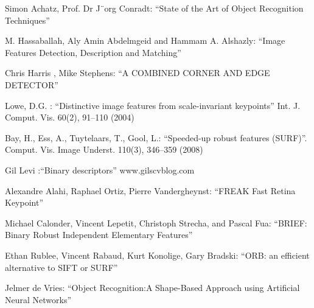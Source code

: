 \documentclass[9pt,shortpaper,twoside,web]{ieeecolor}
\begin{document}
\begin{thebibliography}{00}

 Simon Achatz, Prof. Dr J¨org Conradt: ``State of the Art of Object Recognition Techniques''

 M. Hassaballah, Aly Amin Abdelmgeid and Hammam A. Alshazly: ``Image Features Detection, Description and Matching''

 Chris Harris , Mike Stephens: ``A COMBINED CORNER AND EDGE DETECTOR''

 Lowe, D.G. : ``Distinctive image features from scale-invariant keypoints'' Int. J. Comput. Vis. 60(2), 91–110 (2004)

  Bay, H., Ess, A., Tuytelaars, T., Gool, L.: ``Speeded-up robust features (SURF)''. Comput. Vis. Image Underst. 110(3), 346–359 (2008)

 Gil Levi :``Binary descriptors'' www.gilscvblog.com 

 Alexandre Alahi, Raphael Ortiz, Pierre Vandergheynst: ``FREAK Fast Retina Keypoint''

 Michael Calonder, Vincent Lepetit, Christoph Strecha, and Pascal Fua: ``BRIEF: Binary Robust Independent Elementary Features''

 Ethan Rublee, Vincent Rabaud, Kurt Konolige, Gary Bradski: ``ORB: an efficient alternative to SIFT or SURF''

 Jelmer de Vries: ``Object Recognition:A Shape-Based Approach using Artificial Neural Networks''

\end{thebibliography}
\end{document}
